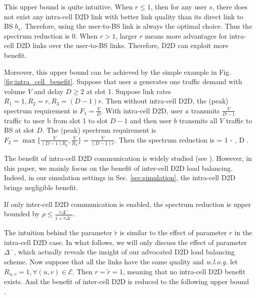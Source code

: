 This upper bound is quite intuitive. When $r \le 1$, then for any user $s$, there does
not exist any intra-cell D2D link with better link quality than its direct link to BS $b_s$.
Therefore, using the user-to-BS link is always the optimal choice. Thus the spectrum
reduction is 0. When $r > 1$, larger $r$ means more advantages for intra-cell D2D links
over the user-to-BS links. Therefore, D2D can exploit more benefit.

Moreover, this upper bound can be achieved by the simple example in Fig. \ref{fig:intra_cell_benefit}.
Suppose that user $a$ generates one traffic demand with volume $V$ and delay $D \ge 2$ at slot 1.
Suppose link rates $R_1=1, R_2=r, R_3=(D-1)r$.
Then without intra-cell D2D, the (peak) spectrum requirement is $F_1=\frac{V}{D}$. With intra-cell
D2D, user $a$ transmits $\frac{V}{D-1}$ traffic to user b from slot
1 to slot $D-1$ and then user $b$ transmits all $V$ traffic to BS at slot $D$.
The (peak) spectrum requirement is $F_2 = \max\{\frac{V}{(D-1)R_2}, \frac{V}{R_3}\} = \frac{V}{(D-1)r}$.
Then the spectrum reduction is
\be
{} = 1 -  \to {},
 \; D \to \infty.
\ee


The benefit of intra-cell D2D communication is widely studied (see \cite{Doppler09} \cite{Foder12}).
However, in this paper, we mainly focus on the benefit of inter-cell D2D load balancing. Indeed,
in our simulation settings in Sec. \ref{sec:simulation}, the intra-cell D2D brings negligible benefit.

\begin{corollary} \label{cor:inter_cell_benefit}
If only inter-cell D2D communication is enabled, the  spectrum reduction is upper bounded by
$
\rho \le \frac{\tilde{r} \Delta^-}{1 + \tilde{r} \Delta^-}.
$
\end{corollary}

The intuition behind the parameter $\tilde{r}$ is similar to the effect of
parameter $r$ in the intra-cell D2D case. In what follows, we will
only discuss the effect of parameter $\Delta^-$, which actually
reveals the insight of our advocated D2D load balancing scheme.
Now suppose that all the links have the
same quality and \emph{w.l.o.g.} let $R_{u,v}=1, \forall (u,v) \in \mathcal{E}$. Then
$r = \tilde{r} =1$, meaning that no intra-cell D2D benefit exists. And the benefit
of inter-cell D2D is reduced to the following upper bound
\be
\rho \le {}.
\label{equ:bound_delta}
\ee

